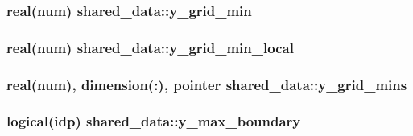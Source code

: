 \subsubsection[{\texorpdfstring{y\+\_\+grid\+\_\+min}{y_grid_min}}]{\setlength{\rightskip}{0pt plus 5cm}real(num) shared\+\_\+data\+::y\+\_\+grid\+\_\+min}\hypertarget{namespaceshared__data_a427f8d5d09444c1a0e5a4cfac1821143}{}\label{namespaceshared__data_a427f8d5d09444c1a0e5a4cfac1821143}
\subsubsection[{\texorpdfstring{y\+\_\+grid\+\_\+min\+\_\+local}{y_grid_min_local}}]{\setlength{\rightskip}{0pt plus 5cm}real(num) shared\+\_\+data\+::y\+\_\+grid\+\_\+min\+\_\+local}\hypertarget{namespaceshared__data_ae639d9c6de4b202530ffc9c74cfaf75b}{}\label{namespaceshared__data_ae639d9c6de4b202530ffc9c74cfaf75b}
\subsubsection[{\texorpdfstring{y\+\_\+grid\+\_\+mins}{y_grid_mins}}]{\setlength{\rightskip}{0pt plus 5cm}real(num), dimension(\+:), pointer shared\+\_\+data\+::y\+\_\+grid\+\_\+mins}\hypertarget{namespaceshared__data_a54dff3f43983b04af43c4eb2d91dea38}{}\label{namespaceshared__data_a54dff3f43983b04af43c4eb2d91dea38}
\subsubsection[{\texorpdfstring{y\+\_\+max\+\_\+boundary}{y_max_boundary}}]{\setlength{\rightskip}{0pt plus 5cm}logical(idp) shared\+\_\+data\+::y\+\_\+max\+\_\+boundary}\hypertarget{namespaceshared__data_a72d92c74a360b173dd6bc143b5b376b4}{}\label{namespaceshared__data_a72d92c74a360b173dd6bc143b5b376b4}
